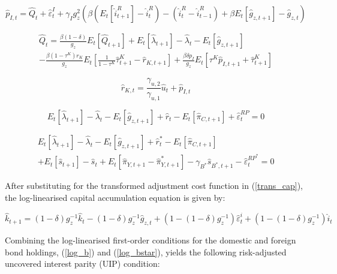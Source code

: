 \documentclass[a4paper,11pt]{article}
\numberwithin{equation}{section}
\begin{document}
	\begin{equation}
	\hat{p}_{I,t}=\hat{Q}_t+\hat{\varepsilon}^I_t+\gamma_Ig^2_z\left(\beta\left(E_t\left[\hat{i}^R_{t+1}\right]-\hat{i}^R_t\right)-\left(\hat{i}^R_t-\hat{i}^R_{t-1}\right)+\beta E_t\left[\hat{g}_{z,t+1}\right]-\hat{g}_{z,t}\right)
	\end{equation}
	
	\begin{multline}
	\hat{Q}_t=\frac{\beta(1-\delta)}{g_z}E_t\left[\hat{Q}_{t+1}\right]+E_t\left[\hat{\lambda}_{t+1}\right]-\hat{\lambda}_t-E_t\left[\hat{g}_{z,t+1}\right]\\-\frac{\beta(1-\tau^K)r_K}{g_z}E_t\left[\frac{1}{1-\tau^K}\hat{\tau}^K_{t+1}-\hat{r}_{K,t+1}\right]+\frac{\beta\delta p_I}{g_z}E_t\left[\tau^K\hat{p}_{I,t+1}+\hat{\tau}^K_{t+1}\right]
	\end{multline}
	
	\begin{equation}
	\hat{r}_{K,t}=\frac{\gamma_{u,2}}{\gamma_{u,1}}\hat{u}_t+\hat{p}_{I,t}
	\end{equation}
	
	\begin{equation} \label{log_b}
	E_t\left[\hat{\lambda}_{t+1}\right]-\hat{\lambda}_t-E_t\left[\hat{g}_{z,t+1}\right]+\hat{r}_t-E_t\left[\hat{\pi}_{C,t+1}\right]+\hat{\varepsilon}_t^{RP}=0
	\end{equation}
	
	\begin{multline} \label{log_bstar}
	E_t\left[\hat{\lambda}_{t+1}\right]-\hat{\lambda}_t-E_t\left[\hat{g}_{z,t+1}\right]+\hat{r}^*_t-E_t\left[\hat{\pi}_{C,t+1}\right]\\+E_t\left[\hat{s}_{t+1}\right]-\hat{s}_t+E_t\left[\hat{\pi}_{Y,t+1}-\hat{\pi}^*_{Y,t+1}\right]-\gamma_{B^*}\hat{s}_{B^*,t+1}-\hat{\varepsilon}^{RP^*}_t=0
	\end{multline}
	
	After substituting for the transformed adjustment cost function in (\ref{trans_cap}), the log-linearised capital accumulation equation is given by:
	
	\begin{equation}
	\hat{k}_{t+1}=(1-\delta)g^{-1}_z\hat{k}_t-(1-\delta)g^{-1}_z\hat{g}_{z,t}+(1-(1-\delta)g^{-1}_z)\hat{\varepsilon}^i_t+(1-(1-\delta)g^{-1}_z)\hat{i}_t
	\end{equation}
	
	Combining the log-linearised first-order conditions for the domestic and foreign bond holdings, (\ref{log_b}) and (\ref{log_bstar}), yields the following risk-adjusted uncovered interest parity (UIP) condition:
	
\end{document}
